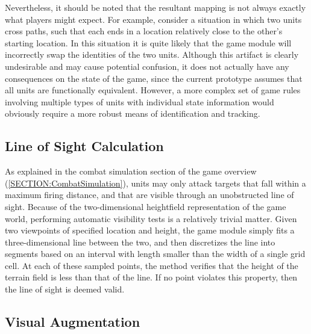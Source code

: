 \documentclass{thesis}
\begin{document}
Nevertheless, it should be noted that the resultant mapping is not always exactly what players might expect. For example, consider a situation in which two units cross paths, such that each ends in a location relatively close to the other's starting location. In this situation it is quite likely that the game module will incorrectly swap the identities of the two units. Although this artifact is clearly undesirable and may cause potential confusion, it does not actually have any consequences on the state of the game, since the current prototype assumes that all units are functionally equivalent. However, a more complex set of game rules involving multiple types of units with individual state information would obviously require a more robust means of identification and tracking.

\subsection{Line of Sight Calculation }

As explained in the combat simulation section of the game overview (\ref{SECTION:CombatSimulation}), units may only attack targets that fall within a maximum firing distance, and that are visible through an unobstructed line of sight. Because of the two-dimensional heightfield representation of the game world, performing automatic visibility tests is a relatively trivial matter. Given two viewpoints of specified location and height, the game module simply fits a three-dimensional line between the two, and then discretizes the line into segments based on an interval with length smaller than the width of a single grid cell. At each of these sampled points, the method verifies that the height of the terrain field is less than that of the line. If no point violates this property, then the line of sight is deemed valid.


\subsection{Visual Augmentation }
\end{document}
